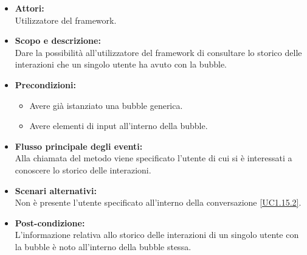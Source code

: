 \begin{itemize}
	\item \textbf{Attori:}
	\\Utilizzatore del framework.
	\item \textbf{Scopo e descrizione:} 
	\\Dare la possibilità all'utilizzatore del framework di consultare lo storico delle interazioni che un singolo utente ha avuto con la bubble.
	\item \textbf{Precondizioni:}
	\begin{itemize}
		\item Avere già istanziato una bubble generica.
		\item Avere elementi di input all'interno della bubble.
	\end{itemize}
	\item \textbf{Flusso principale degli eventi:}
	\\Alla chiamata del metodo viene specificato l'utente di cui si è interessati a conoscere lo storico delle interazioni.
	\item \textbf{Scenari alternativi:}
	\\Non è presente l'utente specificato all'interno della conversazione \ref{UC1.15.2}.
	\item \textbf{Post-condizione:}
	\\L'informazione relativa allo storico delle interazioni di un singolo utente con la bubble è noto all'interno della bubble stessa.
\end{itemize}


